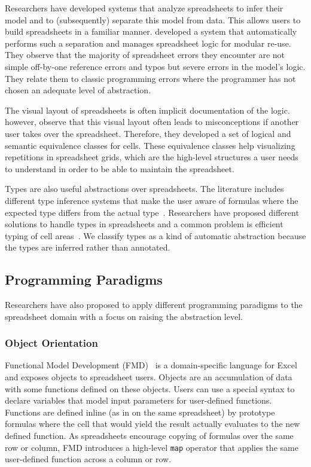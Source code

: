 \documentclass[a4paper]{article}
\begin{document}
Researchers have developed systems that analyze spreadsheets to infer their model and to (subsequently) separate this model from data. This allows users to build spreadsheets in a familiar manner. \citet{Isakowitz:1995:TLT:195705.195708} developed a system that automatically performs such a separation and manages spreadsheet logic for modular re-use. They observe that the majority of spreadsheet errors they encounter are not simple off-by-one reference errors and typos but severe errors in the model's logic. They relate them to classic programming errors where the programmer has not chosen an adequate level of abstraction.

The visual layout of spreadsheets is often implicit documentation of the logic. \citet{1173080} however, observe that this visual layout often leads to misconceptions if another user takes over the spreadsheet. Therefore, they developed a set of logical and semantic equivalence classes for cells. These equivalence classes help visualizing repetitions in spreadsheet grids, which are the high-level structures a user needs to understand in order to be able to maintain the spreadsheet.

Types are also useful abstractions over spreadsheets. The literature includes different type inference systems that make the user aware of formulas where the expected type differs from the actual type~\cite{Abraham:2006:TIS:1140335.1140346, Cheng2015Static}. Researchers have proposed different solutions to handle types in spreadsheets and a common problem is efficient typing of cell areas~\cite{Abraham:2006:TIS:1140335.1140346, Cheng2012Abstract}. We classify types as a kind of automatic abstraction because the types are inferred rather than annotated.

\subsection{Programming Paradigms}
\label{sec:progr-parad}

Researchers have also proposed to apply different programming paradigms to the spreadsheet domain with a focus on raising the abstraction level.

\subsubsection{Object Orientation}

Functional Model Development (FMD)~\cite{Benfield:2009:FFD:1668113.1668121} is a domain-specific language for Excel and exposes objects to spreadsheet users. Objects are an accumulation of data with some functions defined on these objects. Users can use a special syntax to declare variables that model input parameters for user-defined functions. Functions are defined inline (as in on the same spreadsheet) by prototype formulas where the cell that would yield the result actually evaluates to the new defined function. As spreadsheets encourage copying of formulas over the same row or column, FMD introduces a high-level \texttt{map} operator that applies the same user-defined function across a column or row.
\end{document}
